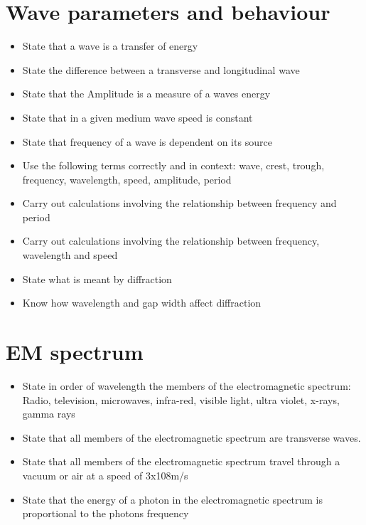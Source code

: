 \section{Wave parameters and behaviour}
\begin{multicols}{2}
	\begin{itemize}
		\item State that a wave is a transfer of energy
		\item State the difference between a transverse and longitudinal wave
		\item State that the Amplitude is a measure of a waves energy
		\item State that in a given medium wave speed is constant
		\item State that frequency of a wave is dependent on its source 
		\item Use the following terms correctly and in context: wave, crest, trough,
			frequency, wavelength, speed, amplitude, period
		\item Carry out calculations involving the relationship between frequency
			and period
		\item Carry out calculations involving the relationship between frequency,
			wavelength and speed
		\item State what is meant by diffraction
		\item Know how wavelength and gap width affect diffraction
	\end{itemize}
\end{multicols}

\section{EM spectrum}
\begin{multicols}{2}
	\begin{itemize}
		\item State in order of wavelength the members of the electromagnetic
			spectrum: Radio, television, microwaves, infra-red, visible light, ultra
			violet, x-rays, gamma rays
		\item State that all members of the electromagnetic spectrum are transverse
			waves.
		\item State that all members of the electromagnetic spectrum travel through
			a vacuum or air at a speed of 3x108m/s
		\item State that the energy of a photon in the electromagnetic spectrum is
			proportional to the photons frequency
	\end{itemize}
\end{multicols}

